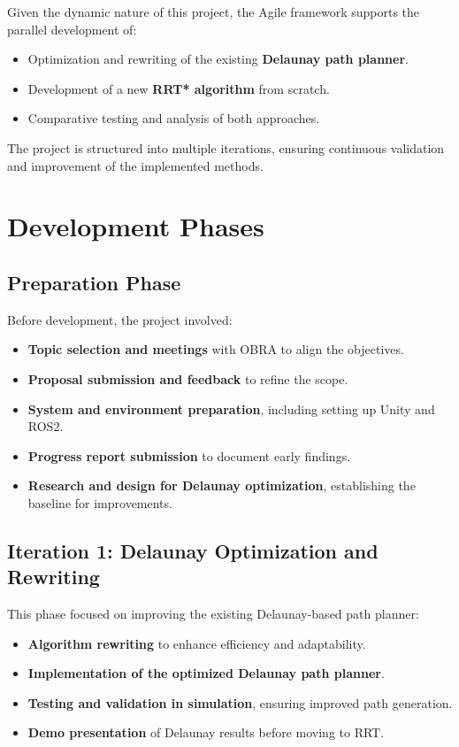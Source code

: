 \documentclass[a4paper,11pt]{report}
\begin{document}
Given the dynamic nature of this project, the Agile framework supports the parallel development of:
\begin{itemize}
    \item Optimization and rewriting of the existing \textbf{Delaunay path planner}.
    \item Development of a new \textbf{RRT* algorithm} from scratch.
    \item Comparative testing and analysis of both approaches.
\end{itemize}

The project is structured into multiple iterations, ensuring continuous validation and improvement of the implemented methods.

\section{Development Phases}

\subsection{Preparation Phase}
Before development, the project involved:
\begin{itemize}
    \item \textbf{Topic selection and meetings} with OBRA to align the objectives.
    \item \textbf{Proposal submission and feedback} to refine the scope.
    \item \textbf{System and environment preparation}, including setting up Unity and ROS2.
    \item \textbf{Progress report submission} to document early findings.
    \item \textbf{Research and design for Delaunay optimization}, establishing the baseline for improvements.
\end{itemize}

\subsection{Iteration 1: Delaunay Optimization and Rewriting}
This phase focused on improving the existing Delaunay-based path planner:
\begin{itemize}
    \item \textbf{Algorithm rewriting} to enhance efficiency and adaptability.
    \item \textbf{Implementation of the optimized Delaunay path planner}.
    \item \textbf{Testing and validation in simulation}, ensuring improved path generation.
    \item \textbf{Demo presentation} of Delaunay results before moving to RRT.
\end{itemize}
\end{document}
